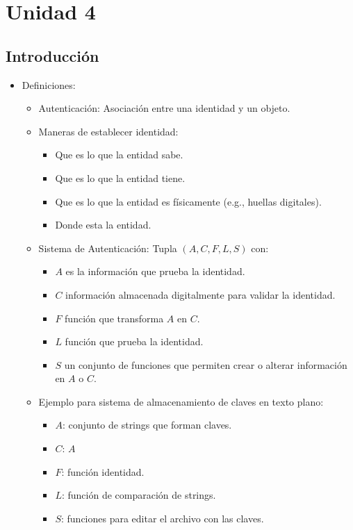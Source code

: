 \section{Unidad 4}

\subsection{Introducción}

\begin{itemize}
	\item Definiciones: 
	\begin{itemize}
		\item Autenticación: Asociación entre una identidad y un objeto.
		\item Maneras de establecer identidad: \begin{itemize}
			\item Que es lo que la entidad sabe.
			\item Que es lo que la entidad tiene.
			\item Que es lo que la entidad es físicamente (e.g., huellas digitales).
			\item Donde esta la entidad.
		\end{itemize}
		\item Sistema de Autenticación: Tupla $(A,C,F,L,S)$ con: \begin{itemize}
			\item $A$ es la información que prueba la identidad.
			\item $C$ información almacenada digitalmente para validar la identidad.
			\item $F$ función que transforma $A$ en $C$.
			\item $L$ función que prueba la identidad.
			\item $S$ un conjunto de funciones que permiten crear o alterar información en $A$ o $C$.
		\end{itemize}
		\item Ejemplo para sistema de almacenamiento de claves en texto plano:
		\begin{itemize}
			\item $A$: conjunto de strings que forman claves.
			\item $C$: $A$
			\item $F$: función identidad.
			\item $L$: función de comparación de strings.
			\item $S$: funciones para editar el archivo con las claves.
		\end{itemize}

\end{itemize}
\end{itemize}

